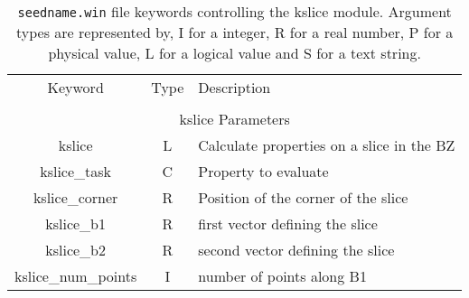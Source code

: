 \begin{table}[hH!]
\begin{center}
\begin{tabular}{|c|c|p{6cm}|}
\hline
Keyword & Type & Description \\
        &      &             \\
\hline\hline
\multicolumn{3}{|c|}{kslice Parameters} \\
\hline
{\sc kslice}  & L & Calculate properties on a slice in the BZ \\
{\sc kslice\_task}& C & Property to evaluate\\
{\sc kslice\_corner}& R & Position of the corner of the slice\\
{\sc kslice\_b1}& R & first vector defining the slice\\
{\sc kslice\_b2}& R & second vector defining the slice\\
{\sc kslice\_num\_points}& I & number of points along B1\\
\hline
\end{tabular}
\caption[Parameter file keywords controlling the kslice module.]
{{\tt seedname.win} file keywords controlling the kslice module. Argument types
are represented by, I for a integer, R for a real number, P for a
physical value, L for a logical value and S for a text string.}
\label{parameter_keywords_kslice}
\end{center}
\end{table}



